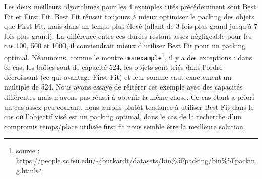 \documentclass{article}
\begin{document}
Les deux meilleurs algorithmes pour les 4 exemples cités précédemment sont Best Fit et First Fit.
Best Fit réussit toujours à mieux optimiser le packing des objets que First Fit, mais dans un temps plus élevé (allant de 3 fois plus grand jusqu'à 7 fois plus grand).
La différence entre ces durées restant assez négligeable pour les cas 100, 500 et 1000, il conviendrait mieux d'utiliser Best Fit pour un packing optimal.
Néanmoins, comme le montre \texttt{monexample}\footnote{source : \url{https://people.sc.fsu.edu/~jburkardt/datasets/bin\%5Fpacking/bin\%5Fpacking.html}}, il y a des exceptions : dans ce cas, les boîtes sont de capacité 524,
les objets sont triés dans l'ordre décroissant (ce qui avantage First Fit) et leur somme vaut exactement un multiple de 524.
Nous avons essayé de réitérer cet exemple avec des capacités différentes mais n'avons pas réussi à obtenir la même chose.
Ce cas étant a priori un cas assez peu courant, nous aurons plutôt tendance à utiliser Best Fit dans le cas où l'objectif visé est un packing optimal, dans le cas
de la recherche d'un compromis temps/place utilisée first fit nous semble être la meilleure solution.
\end{document}
